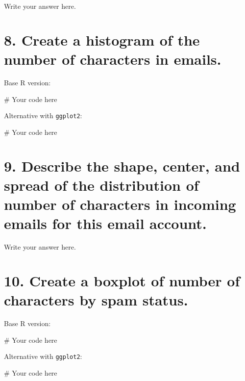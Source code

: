 \documentclass[
  letterpaper,
  DIV=11,
  numbers=noendperiod]{scrreprt}
\newenvironment{Shaded}{\begin{snugshade}}{\end{snugshade}}
\newcommand{\CommentTok}[1]{\textcolor[rgb]{0.37,0.37,0.37}{#1}}
\begin{document}
Write your answer here.

\section{8. Create a histogram of the number of characters in
emails.}\label{create-a-histogram-of-the-number-of-characters-in-emails.}

Base R version:

\begin{Shaded}
\begin{Highlighting}[]
\CommentTok{\# Your code here}
\end{Highlighting}
\end{Shaded}

Alternative with \texttt{ggplot2}:

\begin{Shaded}
\begin{Highlighting}[]
\CommentTok{\# Your code here}
\end{Highlighting}
\end{Shaded}

\section{9. Describe the shape, center, and spread of the distribution
of number of characters in incoming emails for this email
account.}\label{describe-the-shape-center-and-spread-of-the-distribution-of-number-of-characters-in-incoming-emails-for-this-email-account.}

Write your answer here.

\section{10. Create a boxplot of number of characters by spam
status.}\label{create-a-boxplot-of-number-of-characters-by-spam-status.}

Base R version:

\begin{Shaded}
\begin{Highlighting}[]
\CommentTok{\# Your code here}
\end{Highlighting}
\end{Shaded}

Alternative with \texttt{ggplot2}:

\begin{Shaded}
\begin{Highlighting}[]
\CommentTok{\# Your code here}
\end{Highlighting}
\end{Shaded}
\end{document}
